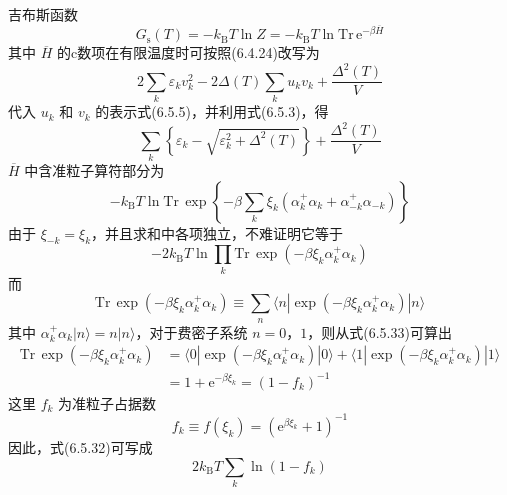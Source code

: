 吉布斯函数
\begin{equation}
  G_{\mathrm{s}}(T)=-k_{\mathrm{B}}T\ln Z
  =-k_{\mathrm{B}}T\ln\mathrm{Tr}\,\mathrm{e}^{-\beta\overline{H}}
\end{equation}
其中 $\overline{H}$ 的c数项在有限温度时可按照(6.4.24)改写为
\begin{equation}
  2\sum_{k}\varepsilon_{k}v_{k}^{2}
  -2\Delta(T)\sum_{k}u_{k}v_{k}
  +\frac{\Delta^{2}(T)}{V}
\end{equation}
代入 $u_{k}$ 和 $v_{k}$ 的表示式(6.5.5)，并利用式(6.5.3)，得
\begin{equation}
  \sum_{k}\left\{\varepsilon_{k}
  -\sqrt{\varepsilon_{k}^{2}+\Delta^{2}(T)}\right\}
  +\frac{\Delta^{2}(T)}{V}
\end{equation}
$\overline{H}$ 中含准粒子算符部分为
\begin{equation}
  -k_{\mathrm{B}}T\ln\mathrm{Tr}\,\exp\left\{-\beta\sum_{k}\xi_{k}
  \left(\alpha^{+}_{k}\alpha_{k}+\alpha^{+}_{-k}\alpha_{-k}\right)\right\}
\end{equation}
由于 $\xi_{-k}=\xi_{k}$，并且求和中各项独立，不难证明它等于
\begin{equation}
  -2k_{\mathrm{B}}T\ln\prod_{k}\mathrm{Tr}\,\exp\left(-\beta\xi_{k}
  \alpha^{+}_{k}\alpha_{k}\right)
\end{equation}
而
\begin{equation}
  \mathrm{Tr}\,\exp\left(-\beta\xi_{k}\alpha^{+}_{k}\alpha_{k}\right)\equiv
  \sum_{n}\langle n|\exp\left(-\beta\xi_{k}\alpha^{+}_{k}\alpha_{k}\right)|n\rangle
\end{equation}
其中 $\alpha^{+}_{k}\alpha_{k}|n\rangle=n|n\rangle$，对于费密子系统 $n=0$，$1$，则从式(6.5.33)可算出
\begin{equation}
\begin{aligned}
  \mathrm{Tr}\,\exp\left(-\beta\xi_{k}\alpha^{+}_{k}\alpha_{k}\right)
  &=\langle0|\exp\left(-\beta\xi_{k}\alpha^{+}_{k}\alpha_{k}\right)|0\rangle
  +\langle1|\exp\left(-\beta\xi_{k}\alpha^{+}_{k}\alpha_{k}\right)|1\rangle\\
  &=1+\mathrm{e}^{-\beta\xi_{k}}=\left(1-f_{k}\right)^{-1}
\end{aligned}
\end{equation}
这里 $f_{k}$ 为准粒子占据数
\begin{equation}
  f_{k}\equiv f(\xi_{k})=\left(\mathrm{e}^{\beta\xi_{k}}+1\right)^{-1}
\end{equation}
因此，式(6.5.32)可写成
\begin{equation}
  2k_{\mathrm{B}}T\sum_{k}\ln\left(1-f_{k}\right)
\end{equation}
